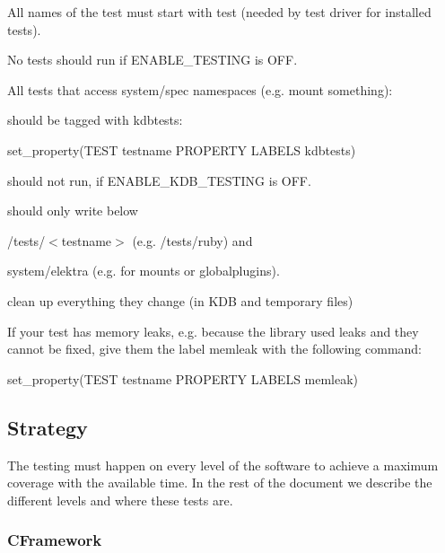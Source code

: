\begin{DoxyItemize}
\item All names of the test must start with test (needed by test driver for installed tests).
\item No tests should run if E\+N\+A\+B\+L\+E\+\_\+\+T\+E\+S\+T\+I\+NG is O\+FF.
\item All tests that access system/spec namespaces (e.\+g. mount something)\+:
\begin{DoxyItemize}
\item should be tagged with {\ttfamily kdbtests}\+: \begin{DoxyVerb} set_property(TEST testname PROPERTY LABELS kdbtests)
\end{DoxyVerb}

\item should not run, if {\ttfamily E\+N\+A\+B\+L\+E\+\_\+\+K\+D\+B\+\_\+\+T\+E\+S\+T\+I\+NG} is O\+FF.
\item should only write below
\begin{DoxyItemize}
\item {\ttfamily /tests/$<$testname$>$} (e.\+g. {\ttfamily /tests/ruby}) and
\item {\ttfamily system/elektra} (e.\+g. for mounts or globalplugins).
\end{DoxyItemize}
\item clean up everything they change (in K\+DB and temporary files)
\end{DoxyItemize}
\item If your test has memory leaks, e.\+g. because the library used leaks and they cannot be fixed, give them the label {\ttfamily memleak} with the following command\+: \begin{DoxyVerb}  set_property(TEST testname PROPERTY LABELS memleak)
\end{DoxyVerb}

\end{DoxyItemize}

\subsection*{Strategy}

The testing must happen on every level of the software to achieve a maximum coverage with the available time. In the rest of the document we describe the different levels and where these tests are.

\subsubsection*{C\+Framework}

